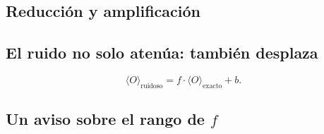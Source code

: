 \subsection{Reducción y amplificación}
%
%

\subsection{El ruido no solo atenúa: también desplaza}
\begin{equation}
\label{eq:modelo_afin}
\langle O \rangle_{\text{ruidoso}} = f \cdot \langle O \rangle_{\text{exacto}} + b .
\end{equation}

\subsection{Un aviso sobre el rango de \texorpdfstring{$f$}{f}}


